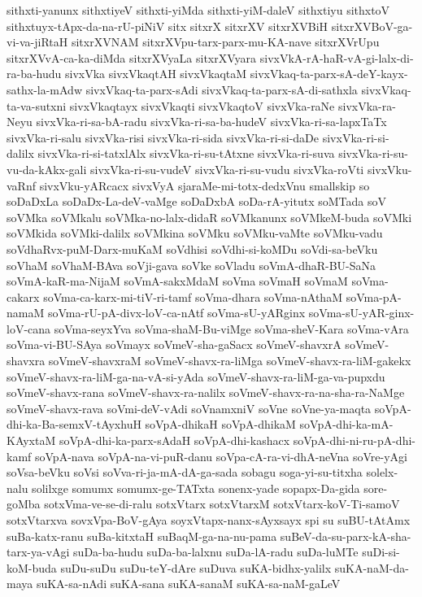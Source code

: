 {sithxti-yanunx
sithxtiyeV
sithxti-yiMda
sithxti-yiM-daleV
sithxtiyu
sithxtoV
sithxtuyx-tApx-da-na-rU-piNiV
sitx
sitxrX
sitxrXV
sitxrXVBiH
sitxrXVBoV-ga-vi-va-jiRtaH
sitxrXVNAM
sitxrXVpu-tarx-parx-mu-KA-nave
sitxrXVrUpu
sitxrXVvA-ca-ka-diMda
sitxrXVyaLa
sitxrXVyara
sivxVkA-rA-haR-vA-gi-lalx-di-ra-ba-hudu
sivxVka
sivxVkaqtAH
sivxVkaqtaM
sivxVkaq-ta-parx-sA-deY-kayx-sathx-la-mAdw
sivxVkaq-ta-parx-sAdi
sivxVkaq-ta-parx-sA-di-sathxla
sivxVkaq-ta-va-sutxni
sivxVkaqtayx
sivxVkaqti
sivxVkaqtoV
sivxVka-raNe
sivxVka-ra-Neyu
sivxVka-ri-sa-bA-radu
sivxVka-ri-sa-ba-hudeV
sivxVka-ri-sa-lapxTaTx
sivxVka-ri-salu
sivxVka-risi
sivxVka-ri-sida
sivxVka-ri-si-daDe
sivxVka-ri-si-dalilx
sivxVka-ri-si-tatxlAlx
sivxVka-ri-su-tAtxne
sivxVka-ri-suva
sivxVka-ri-su-vu-da-kAkx-gali
sivxVka-ri-su-vudeV
sivxVka-ri-su-vudu
sivxVka-roVti
sivxVku-vaRnf
sivxVku-yARcacx
sivxVyA
sjaraMe-mi-totx-dedxVnu
smallskip
so
soDaDxLa
soDaDx-La-deV-vaMge
soDaDxbA
soDa-rA-yitutx
soMTada
soV
soVMka
soVMkalu
soVMka-no-lalx-didaR
soVMkanunx
soVMkeM-buda
soVMki
soVMkida
soVMki-dalilx
soVMkina
soVMku
soVMku-vaMte
soVMku-vadu
soVdhaRvx-puM-Darx-muKaM
soVdhisi
soVdhi-si-koMDu
soVdi-sa-beVku
soVhaM
soVhaM-BAva
soVji-gava
soVke
soVladu
soVmA-dhaR-BU-SaNa
soVmA-kaR-ma-NijaM
soVmA-sakxMdaM
soVma
soVmaH
soVmaM
soVma-cakarx
soVma-ca-karx-mi-tiV-ri-tamf
soVma-dhara
soVma-nAthaM
soVma-pA-namaM
soVma-rU-pA-divx-loV-ca-nAtf
soVma-sU-yARginx
soVma-sU-yAR-ginx-loV-cana
soVma-seyxYva
soVma-shaM-Bu-viMge
soVma-sheV-Kara
soVma-vAra
soVma-vi-BU-SAya
soVmayx
soVmeV-sha-gaSacx
soVmeV-shavxrA
soVmeV-shavxra
soVmeV-shavxraM
soVmeV-shavx-ra-liMga
soVmeV-shavx-ra-liM-gakekx
soVmeV-shavx-ra-liM-ga-na-vA-si-yAda
soVmeV-shavx-ra-liM-ga-va-pupxdu
soVmeV-shavx-rana
soVmeV-shavx-ra-nalilx
soVmeV-shavx-ra-na-sha-ra-NaMge
soVmeV-shavx-rava
soVmi-deV-vAdi
soVnamxniV
soVne
soVne-ya-maqta
soVpA-dhi-ka-Ba-semxV-tAyxhuH
soVpA-dhikaH
soVpA-dhikaM
soVpA-dhi-ka-mA-KAyxtaM
soVpA-dhi-ka-parx-sAdaH
soVpA-dhi-kashacx
soVpA-dhi-ni-ru-pA-dhi-kamf
soVpA-nava
soVpA-na-vi-puR-danu
soVpa-cA-ra-vi-dhA-neVna
soVre-yAgi
soVsa-beVku
soVsi
soVva-ri-ja-mA-dA-ga-sada
sobagu
soga-yi-su-titxha
solelx-nalu
solilxge
somumx
somumx-ge-TATxta
sonenx-yade
sopapx-Da-gida
sore-goMba
sotxVma-ve-se-di-ralu
sotxVtarx
sotxVtarxM
sotxVtarx-koV-Ti-samoV
sotxVtarxva
sovxVpa-BoV-gAya
soyxVtapx-nanx-sAyxsayx
spi
su
suBU-tAtAmx
suBa-katx-ranu
suBa-kitxtaH
suBaqM-ga-na-nu-pama
suBeV-da-su-parx-kA-sha-tarx-ya-vAgi
suDa-ba-hudu
suDa-ba-lalxnu
suDa-lA-radu
suDa-luMTe
suDi-si-koM-buda
suDu-suDu
suDu-teY-dAre
suDuva
suKA-bidhx-yalilx
suKA-naM-da-maya
suKA-sa-nAdi
suKA-sana
suKA-sanaM
suKA-sa-naM-gaLeV
}
